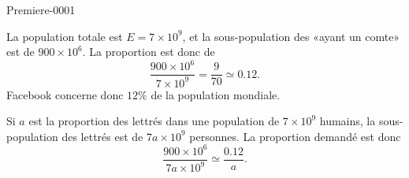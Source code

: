 
\begin{corrige}{Premiere-0001}

    La population totale est \( E=7\times 10^9\), et la sous-population des «ayant un comte» est de \( 900\times 10^6\). La proportion est donc de
    \begin{equation}
        \frac{ 900\times 10^6 }{ 7\times 10^9 }=\frac{ 9 }{ 70 }\simeq 0.12.
    \end{equation}
    Facebook concerne donc \( 12\%\) de la population mondiale.

    Si \( a\) est la proportion des lettrés dans une population de \( 7\times 10^9\) humains, la sous-population des lettrés est de \( 7a\times 10^9\) personnes. La proportion demandé est donc
    \begin{equation}
        \frac{ 900\times 10^6 }{ 7a\times 10^9 }\simeq \frac{ 0.12 }{ a }.
    \end{equation}

\end{corrige}
